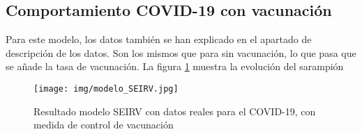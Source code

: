 \subsection{Comportamiento COVID-19 con vacunación}
Para este modelo, los datos también se han explicado en el apartado de descripción de los datos. Son los mismos que para sin vacunación, lo que pasa que se añade la tasa de vacunación. La figura \ref{fig:Simucov vacunacion} muestra la evolución del sarampión

\begin{figure}[H]
    \centering
    \texttt{[image: img/modelo\_SEIRV.jpg]}
    \caption{Resultado modelo SEIRV con datos reales para el COVID-19, con medida de control de vacunación}
    \label{fig:Simucov vacunacion}
    \vspace{0.5cm} %
\end{figure}

